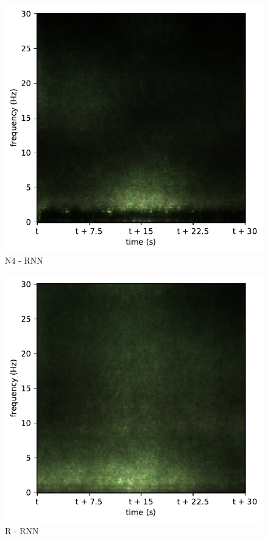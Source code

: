 \begin{subfigure}{.16\textwidth}
  \centering
  \includegraphics[width=1\linewidth]{./pics/class_rnn_4}
  \caption{N4 - RNN}
  \label{fig_1_35}
\end{subfigure}%
\begin{subfigure}{.16\textwidth}
  \centering
  \includegraphics[width=1\linewidth]{./pics/class_rnn_5}
  \caption{R - RNN}
  \label{fig_1_36}
\end{subfigure}
